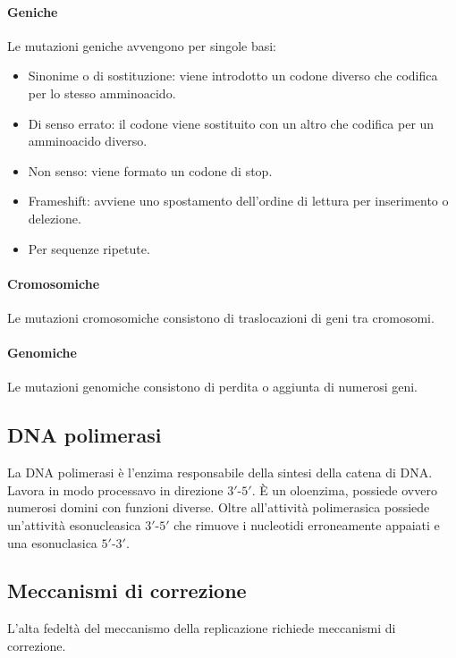 			\paragraph{Geniche}
			Le mutazioni geniche avvengono per singole basi:
			\begin{multicols}{2}
				\begin{itemize}
					\item Sinonime o di sostituzione: viene introdotto un codone diverso che codifica per lo stesso amminoacido.
					\item Di senso errato: il codone viene sostituito con un altro che codifica per un amminoacido diverso.
					\item Non senso: viene formato un codone di stop.
					\item Frameshift: avviene uno spostamento dell'ordine di lettura per inserimento o delezione.
					\item Per sequenze ripetute.
				\end{itemize}
			\end{multicols}
			
			\paragraph{Cromosomiche}
			Le mutazioni cromosomiche consistono di traslocazioni di geni tra cromosomi.

			\paragraph{Genomiche}
			Le mutazioni genomiche consistono di perdita o aggiunta di numerosi geni.

	\subsection{DNA polimerasi}
	La DNA polimerasi \`e l'enzima responsabile della sintesi della catena di DNA.
	Lavora in modo processavo in direzione $3'$-$5'$.
	\`E un oloenzima, possiede ovvero numerosi domini con funzioni diverse.
	Oltre all'attivit\`a polimerasica possiede un'attivit\`a esonucleasica $3'$-$5'$ che rimuove i nucleotidi erroneamente appaiati e una esonuclasica $5'$-$3'$.



	\subsection{Meccanismi di correzione}
	L'alta fedelt\`a del meccanismo della replicazione richiede meccanismi di correzione.

